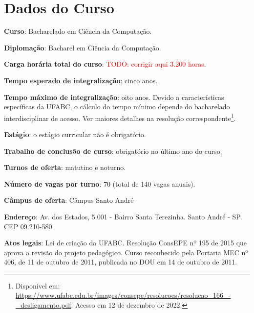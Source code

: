\section{Dados do Curso}
\label{sec:dados_curso}

\textbf{Curso}: Bacharelado em Ciência da Computação.

\textbf{Diplomação}: Bacharel em Ciência da Computação.

\textbf{Carga horária total do curso}: \textcolor{red}{TODO: corrigir aqui 3.200 horas}.

\textbf{Tempo esperado de integralização}: cinco anos.  

\textbf{Tempo máximo de integralização}: oito anos. Devido a características
específicas da UFABC, o cálculo do tempo mínimo depende do bacharelado
interdisciplinar de acesso. Ver maiores detalhes na resolução
correspondente\footnote{Disponível em:
\url{https://www.ufabc.edu.br/images/consepe/resolucoes/resolucao_166_-_desligamento.pdf}.
Acesso em 12 de dezembro de 2022.}.

\textbf{Estágio}: o estágio curricular não é obrigatório.

\textbf{Trabalho de conclusão de curso}: obrigatório no último ano do curso.

\textbf{Turnos de oferta}: matutino e noturno.

\textbf{Número de vagas por turno}: 70 (total de 140 vagas anuais).

\textbf{Câmpus de oferta}: Câmpus Santo André

\textbf{Endereço}: Av. dos Estados, 5.001 - Bairro Santa Terezinha. Santo André
- SP. CEP 09.210-580.

\textbf{Atos legais}: Lei de criação da UFABC. Resolução ConsEPE nº 195 de 2015
que aprova a revisão do projeto pedagógico. Curso reconhecido pela Portaria MEC
nº 406, de 11 de outubro de 2011, publicada no DOU em 14 de outubro de 2011.
